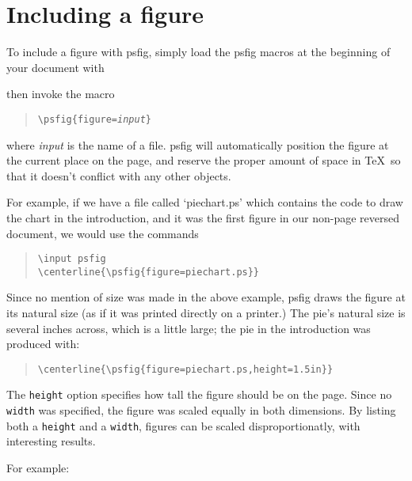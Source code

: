 \section{Including a figure}
To include a \Ps figure with psfig, simply load the psfig macros at the 
beginning of your document with
\par
\begin{quote}
{\tt\verb++}
\end{quote}
\par
then invoke the macro
\par
\begin{quote}
{\tt\verb+\+psfig\{figure={\it input}\}}
\end{quote}
\par
where {\it input} is the name of a \Ps file. 
psfig will automatically position the figure at the current place on the page, 
and reserve the proper amount of space in \TeX\ so that it doesn't conflict
with any other objects.
\par
For example, if we have a file called `piechart.ps' which contains the
\Ps code to draw the chart in the introduction, and it was the first figure
in our non-page reversed document, we would use the commands
\begin{quote}\small
{\tt\verb+\+input psfig } \\
{\tt\verb+\+centerline\{\verb+\+psfig\{figure=piechart.ps\}\}}
\end{quote}
Since no mention of size was made in the above example, psfig draws the figure 
at its natural size (as if it was printed directly on 
a \Ps printer.) The pie's natural size is several inches across, which
is a little large; the pie in the introduction was produced with:
\par
\begin{quote}\small
\tt\verb+\+centerline\{\verb+\+psfig\{figure=piechart.ps,height=1.5in\}\}
\end{quote}
\par
The {\tt height} option specifies how tall the figure should be on the
page. Since no {\tt width} was specified, the figure was scaled equally
in both dimensions.
By listing both a {\tt height} and a {\tt width}, figures can be scaled 
disproportionatly, with interesting results.
\par
For example:
\par
\centerline{\hbox{
}}
